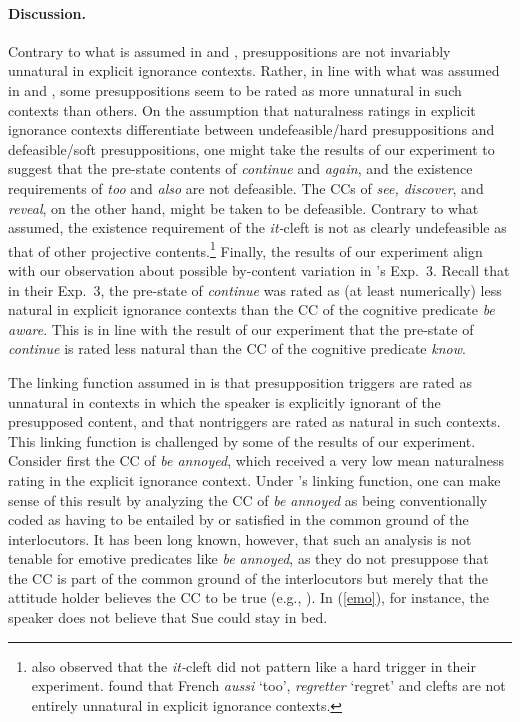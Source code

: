 \documentclass[11pt,fleqn]{article}
\newcommand{\6}{\mbox{$[\hspace*{-.6mm}[$}}
\newcommand{\9}{\mbox{$]\hspace*{-.6mm}]$}}
\newcommand{\citepos}[1]{\citeauthor{#1}'s \citeyear{#1}}
\begin{document}
\paragraph{Discussion.} Contrary to what is assumed in \citealt{mandelkern-etal2020} and \citealt{kalomoiros-schwarz2021,kalomoiros-schwarz-JoS}, presuppositions are not invariably unnatural in explicit ignorance contexts. Rather, in line with what was assumed in \citealt{simons01} and \citealt{abusch10}, some presuppositions seem to be rated as more unnatural in such contexts than others. On the assumption that naturalness ratings in explicit ignorance contexts differentiate between undefeasible/hard presuppositions and defeasible/soft presuppositions, one might take the results of our experiment to suggest that the pre-state contents of {\em continue} and {\em again}, and the existence requirements of {\em too} and {\em also} are not defeasible. The CCs of {\em see, discover}, and {\em reveal}, on the other hand, might be taken to be defeasible. Contrary to what \citealt{abusch10} assumed, the existence requirement of the {\em it-}cleft is not as clearly undefeasible as that of other projective contents.\footnote{\citealt{smith-hall11} also observed that the {\em it-}cleft did not pattern like a hard trigger in their experiment. \citealt{jayez-etal2015} found that French {\em aussi} `too', {\em regretter} `regret' and clefts are not entirely unnatural in explicit ignorance contexts.} Finally, the results of our experiment align with our observation about possible by-content variation in \citepos{mandelkern-etal2020} Exp.~3. Recall that in their Exp.~3, the pre-state of {\em continue} was rated as (at least numerically) less natural in explicit ignorance contexts than the CC of the cognitive predicate {\em be aware}. This is in line with the result of our experiment that the pre-state of {\em continue} is rated less natural than the CC of the cognitive predicate {\em know}.

The linking function assumed in \citealt{mandelkern-etal2020} is that presupposition triggers are rated as unnatural in contexts in which the speaker is explicitly ignorant of the presupposed content, and that nontriggers are rated as natural in such contexts. This linking function is challenged by some of the results of our experiment. Consider first the CC of {\em be annoyed}, which received a very low mean naturalness rating in the explicit ignorance context. Under \citepos{mandelkern-etal2020} linking function, one can make sense of this result by analyzing the CC of {\em be annoyed} as being conventionally coded as having to be entailed by or satisfied in the common ground of the interlocutors. It has been long known, however, that such an analysis is not tenable for emotive predicates like {\em be annoyed}, as they do not presuppose that the CC is part of the common ground of the interlocutors but merely that the attitude holder believes the CC to be true (e.g., \citealt{heim92,karttunen2016}). In (\ref{emo}), for instance, the speaker does not believe that Sue could stay in bed. 
\end{document}
